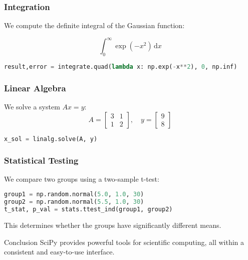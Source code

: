 \begin{frame}[fragile]
\frametitle{Integration}
We compute the definite integral of the Gaussian function:

\[
\int_0^{\infty} \exp(-x^2) \,\text{d}x
\]

\begin{lstlisting}[language=python]
result,error = integrate.quad(lambda x: np.exp(-x**2), 0, np.inf)
\end{lstlisting}

\end{frame}



\begin{frame}[fragile]
\frametitle{Linear Algebra}
We solve a system $Ax = y$:
\[
A = \begin{bmatrix} 3 & 1 \\ 1 & 2 \end{bmatrix}, \quad y = \begin{bmatrix} 9 \\ 8 \end{bmatrix}
\]
%
\begin{lstlisting}[language=python]
x_sol = linalg.solve(A, y)
\end{lstlisting}

\end{frame}

\begin{frame}[fragile]
\frametitle{Statistical Testing}
We compare two groups using a two-sample t-test:
\begin{lstlisting}[language=python]
group1 = np.random.normal(5.0, 1.0, 30)
group2 = np.random.normal(5.5, 1.0, 30)
t_stat, p_val = stats.ttest_ind(group1, group2)
\end{lstlisting}

This determines whether the groups have significantly different means.
\end{frame}

\begin{frame}{Conclusion}
SciPy provides powerful tools for scientific computing, all within a consistent and easy-to-use interface.
\end{frame}
